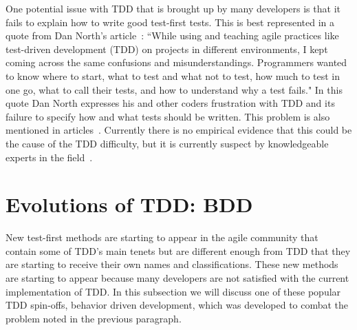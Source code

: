 \documentclass{sig-alternate}
\begin{document}
One potential issue with TDD that is brought up by many developers is that it fails to explain how to write good test-first tests.  This is best represented in a quote from Dan North's article~\cite{North:xxx}: ``While using and teaching agile practices like test-driven development (TDD) on projects in different environments, I kept coming across the same confusions and misunderstandings. Programmers wanted to know where to start, what to test and what not to test, how much to test in one go, what to call their tests, and how to understand why a test fails."  In this quote Dan North expresses his and other coders frustration with TDD and its failure to specify how and what tests should be written.  This problem is also mentioned in articles~\cite{Kettunen:2010, Soeken:2012}.  Currently there is no empirical evidence that this could be the cause of the TDD difficulty, but it is currently suspect by knowledgeable experts in the field~\cite{Soeken:2012, Kettunen:2010, North:xxx}. 

\section{Evolutions of TDD: BDD}

New test-first methods are starting to appear in the agile community that contain some of TDD's main tenets but are different enough from TDD that they are starting to receive their own names and classifications.  These new methods are starting to appear because many developers are not satisfied with the current implementation of TDD.  In this subsection we will discuss one of these popular TDD spin-offs, behavior driven development, which was developed to combat the problem noted in the previous paragraph.


\end{document}

